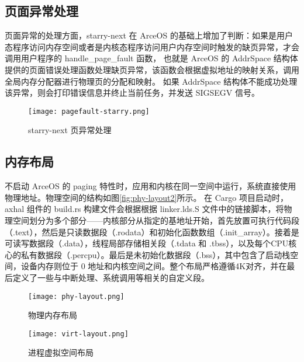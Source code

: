 \subsection{页面异常处理}
页面异常的处理方面，starry-next 在 ArceOS 的基础上增加了判断：如果是用户态程序访问内存空间或者是内核态程序访问用户内存空间时触发的缺页异常，才会调用用户程序的 handle\_page\_fault 函数，
也就是 ArceOS 的 AddrSpace 结构体提供的页面错误处理函数处理缺页异常，该函数会根据虚拟地址的映射关系，调用全局内存分配器进行物理页的分配和映射。
如果 AddrSpace 结构体不能成功处理该异常，则会打印错误信息并终止当前任务，并发送 SIGSEGV 信号。

\begin{figure}[H]
    \centering
    \texttt{[image: pagefault-starry.png]}
    \caption{starry-next 页异常处理}
    \label{fig:pagefault-starry}
\end{figure}

\subsection{内存布局}

不启动 ArceOS 的 paging 特性时，应用和内核在同一空间中运行，系统直接使用物理地址。物理空间的结构如图\ref{fig:phy-layout2}所示。
在 Cargo 项目启动时，axhal 组件的 build.rs 构建文件会根据根据 linker.lds.S 文件中的链接脚本，将物理空间划分为多个部分——内核部分从指定的基地址开始，首先放置可执行代码段（.text），然后是只读数据段（.rodata）和初始化函数数组（.init\_array）。接着是可读写数据段（.data），线程局部存储相关段（.tdata 和 .tbss），以及每个CPU核心的私有数据段（.percpu）。最后是未初始化数据段（.bss），其中包含了启动栈空间，设备内存则位于 0 地址和内核空间之间。整个布局严格遵循4K对齐，并在最后定义了一些与中断处理、系统调用等相关的自定义段。

\begin{figure}[H]
\centering %
\begin{minipage}[b]{0.45\textwidth} %
\centering %
\texttt{[image: phy-layout.png]} %
\caption{物理内存布局}
\label{fig:phy-layout2}
\end{minipage}
\begin{minipage}[b]{0.45\textwidth} %
\centering %
\texttt{[image: virt-layout.png]}%
\caption{进程虚拟空间布局}
\label{fig:virt-layout2}
\end{minipage}
\end{figure}



